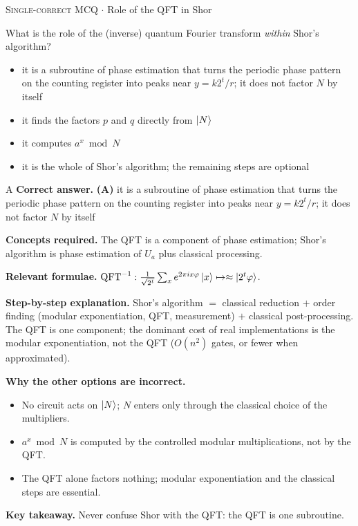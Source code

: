 \documentclass[11pt,a4paper]{article}
\newcommand{\optlabel}[1]{\textbf{(#1)}}
\newcommand{\correctlabel}[1]{\textcolor{okgreen}{\textbf{(#1)}\,\ding{51}}}
\newenvironment{qitem}[1]{\begin{list}{}{\setlength{\leftmargin}{3.3em}\setlength{\labelwidth}{3.1em}%
  \setlength{\labelsep}{0.2em}\setlength{\topsep}{3pt}\setlength{\parsep}{3pt}}\item[\textbf{Q.#1}\hfill]}{\end{list}}
\newcommand{\qsep}{\par\vspace{2pt}{\color{black!15}\hrule}\vspace{4pt}}
\newcommand{\qmeta}[2]{{\footnotesize\color{black!60}\textsc{#1} \;$\cdot$\; #2}\par}
\begin{document}
\begin{qitem}{53}
\qmeta{Single-correct MCQ}{Role of the QFT in Shor}
What is the role of the (inverse) quantum Fourier transform \emph{within} Shor's algorithm?
\begin{itemize}[leftmargin=2.6em, labelsep=0.4em, itemsep=2pt, topsep=3pt]
\item[\correctlabel{A}] it is a subroutine of phase estimation that turns the periodic phase pattern on the counting register into peaks near $y = k2^t/r$; it does not factor $N$ by itself
\item[\optlabel{B}] it finds the factors $p$ and $q$ directly from $\ket N$
\item[\optlabel{C}] it computes $a^x \bmod N$
\item[\optlabel{D}] it is the whole of Shor's algorithm; the remaining steps are optional
\end{itemize}
\end{qitem}
\begin{solbox}{A}
\textbf{\color{brand}Correct answer.} \textcolor{okgreen}{\textbf{(A)}} it is a subroutine of phase estimation that turns the periodic phase pattern on the counting register into peaks near $y = k2^t/r$; it does not factor $N$ by itself

\textbf{\color{brand}Concepts required.} The QFT is a component of phase estimation; Shor's algorithm is phase estimation of $U_a$ plus classical processing.

\textbf{\color{brand}Relevant formulae.} $\mathrm{QFT}^{-1}: \frac{1}{\sqrt{2^t}}\sum_xe^{2\pi ix\varphi}\ket x \mapsto \approx\ket{2^t\varphi}$.

\textbf{\color{brand}Step-by-step explanation.} Shor's algorithm $=$ classical reduction $+$ order finding (modular exponentiation, QFT, measurement) $+$ classical post-processing. The QFT is one
component; the dominant cost of real implementations is the modular exponentiation, not the QFT ($O(n^2)$ gates, or fewer when approximated).

\textbf{\color{brand}Why the other options are incorrect.}
\begin{itemize}[leftmargin=2.4em, itemsep=1pt, topsep=2pt]
\item[\textbf{(B)}] No circuit acts on $\ket N$; $N$ enters only through the classical choice of the multipliers.
\item[\textbf{(C)}] $a^x \bmod N$ is computed by the controlled modular multiplications, not by the QFT.
\item[\textbf{(D)}] The QFT alone factors nothing; modular exponentiation and the classical steps are essential.
\end{itemize}
\textbf{\color{brand}Key takeaway.} Never confuse Shor with the QFT: the QFT is one subroutine.
\end{solbox}
\qsep
\end{document}
